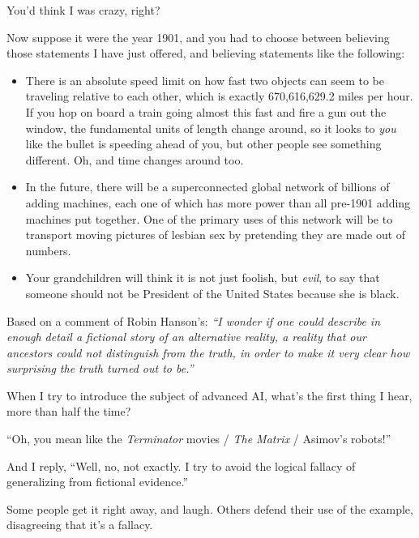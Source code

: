 {
 You'd think I was crazy, right?}

{
 Now suppose it were the year 1901, and you had to choose between
believing those statements I have just offered, and believing
statements like the following:}

\begin{itemize}
\item {
 There is an absolute speed limit on how fast two objects can seem
to be traveling relative to each other, which is exactly 670,616,629.2
miles per hour. If you hop on board a train going almost this fast and
fire a gun out the window, the fundamental units of length change
around, so it looks to \textit{you} like the bullet is speeding ahead
of you, but other people see something different. Oh, and time changes
around too.}

\item {
 In the future, there will be a superconnected global network of
billions of adding machines, each one of which has more power than all
pre-1901 adding machines put together. One of the primary uses of this
network will be to transport moving pictures of lesbian sex by
pretending they are made out of numbers.}

\item {
 Your grandchildren will think it is not just foolish, but
\textit{evil}, to say that someone should not be President of the
United States because she is black.}
\end{itemize}

{
 Based on a comment of Robin Hanson's:
\textit{``I wonder if one could describe in enough
detail a fictional story of an alternative reality, a reality that our
ancestors could not distinguish from the truth, in order to make it
very clear how surprising the truth turned out to
be.''}}

\myendsectiontext


{
 When I try to introduce the subject of advanced AI,
what's the first thing I hear, more than half the time?
}

{
 ``Oh, you mean like the \textit{Terminator}
movies / \textit{The Matrix} / Asimov's
robots!''}

{
 And I reply, ``Well, no, not exactly. I try to
avoid the logical fallacy of generalizing from fictional
evidence.''}

{
 Some people get it right away, and laugh. Others defend their use
of the example, disagreeing that it's a fallacy.}

